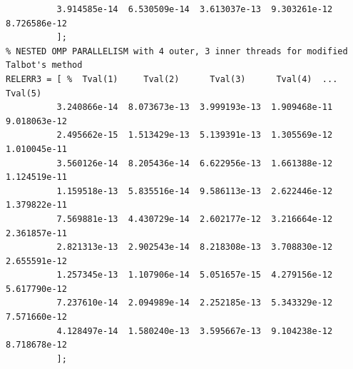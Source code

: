 \documentclass[a4paper,10pt]{report}%
\begin{document}
\begin{lstlisting}
          3.914585e-14  6.530509e-14  3.613037e-13  9.303261e-12  8.726586e-12
          ];
% NESTED OMP PARALLELISM with 4 outer, 3 inner threads for modified Talbot's method
RELERR3 = [ %  Tval(1)     Tval(2)      Tval(3)      Tval(4)  ... Tval(5)
          3.240866e-14  8.073673e-13  3.999193e-13  1.909468e-11  9.018063e-12
          2.495662e-15  1.513429e-13  5.139391e-13  1.305569e-12  1.010045e-11
          3.560126e-14  8.205436e-14  6.622956e-13  1.661388e-12  1.124519e-11
          1.159518e-13  5.835516e-14  9.586113e-13  2.622446e-12  1.379822e-11
          7.569881e-13  4.430729e-14  2.602177e-12  3.216664e-12  2.361857e-11
          2.821313e-13  2.902543e-14  8.218308e-13  3.708830e-12  2.655591e-12
          1.257345e-13  1.107906e-14  5.051657e-15  4.279156e-12  5.617790e-12
          7.237610e-14  2.094989e-14  2.252185e-13  5.343329e-12  7.571660e-12
          4.128497e-14  1.580240e-13  3.595667e-13  9.104238e-12  8.718678e-12
          ];
\end{lstlisting}
\end{document}
